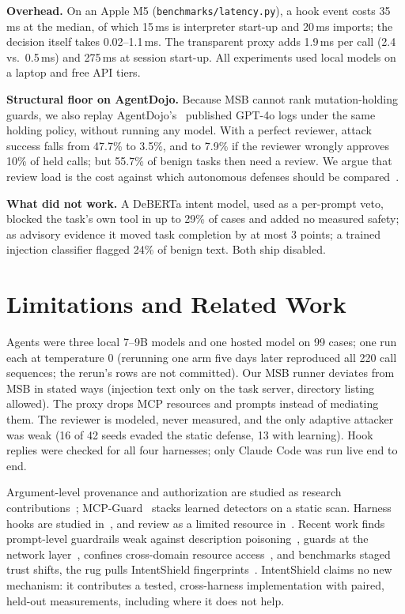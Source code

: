 \documentclass[10pt,conference]{IEEEtran}
\newcommand{\tool}{IntentShield\xspace}
\begin{document}
\textbf{Overhead.} On an Apple M5 (\texttt{benchmarks/latency.py}), a hook event costs 35\,ms at the
median, of which 15\,ms is interpreter start-up and 20\,ms imports; the decision itself takes
0.02--1.1\,ms. The transparent proxy adds 1.9\,ms per call (2.4 vs.\ 0.5\,ms) and 275\,ms at
session start-up. All experiments used local models on a laptop and free API tiers.

\textbf{Structural floor on AgentDojo.} Because MSB cannot rank mutation-holding guards, we also
replay AgentDojo's~\cite{agentdojo} published GPT-4o logs under the same holding policy, without
running any model. With a perfect reviewer, attack success falls from 47.7\% to 3.5\%, and to 7.9\% if
the reviewer wrongly approves 10\% of held calls; but 55.7\% of benign tasks then need a review. We
argue that review load is the cost against which autonomous defenses should be compared~\cite{oversight}.

\textbf{What did not work.} A DeBERTa intent model, used as a per-prompt veto, blocked the task's own tool in up to 29\%
of cases and added no measured safety; as advisory evidence it moved task completion by at most 3 points; a trained injection classifier flagged 24\% of benign text. Both ship disabled.

\section{Limitations and Related Work}
Agents were three local 7--9B models and one hosted model on 99 cases; one run each at temperature 0 (rerunning one arm five days later reproduced all 220 call sequences; the rerun's rows are not committed). Our MSB runner deviates from MSB in
stated ways (injection text only on the task server, directory listing allowed). The proxy drops MCP
resources and prompts instead of mediating them. The reviewer is modeled, never measured, and the only
adaptive attacker was weak (16 of 42 seeds evaded the static defense, 13 with learning). Hook replies were checked for all four harnesses; only Claude Code was run
live end to end.

Argument-level provenance and authorization are studied as research
contributions~\cite{pact,toolfence,camel}; MCP-Guard~\cite{mcpguard} stacks learned detectors on a
static scan. Harness hooks are studied in~\cite{capscope,harnessbench,laundering}, and review as a
limited resource in~\cite{oversight,stack}. Recent work finds prompt-level guardrails weak against
description poisoning~\cite{mcptdp}, guards at the network layer~\cite{shieldnet}, confines
cross-domain resource access~\cite{aegis}, and benchmarks staged trust shifts, the rug pulls \tool
fingerprints~\cite{trustshift}. \tool claims no new mechanism: it contributes a tested,
cross-harness implementation with paired, held-out measurements, including where it does not help.
\end{document}
